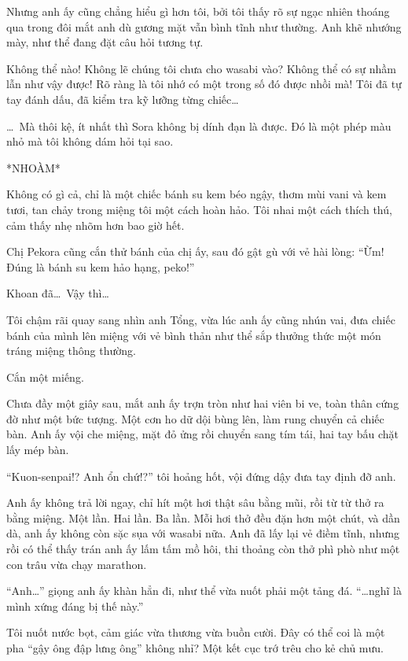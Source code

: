 \documentclass[../main.tex]{subfiles}
\begin{document}
Nhưng anh ấy cũng chẳng hiểu gì hơn tôi, bởi tôi thấy rõ sự ngạc nhiên thoáng qua trong đôi mắt anh dù gương mặt vẫn bình tĩnh như thường. Anh khẽ nhướng mày, như thể đang đặt câu hỏi tương tự.

Không thể nào! Không lẽ chúng tôi chưa cho wasabi vào? Không thể có sự nhầm lẫn như vậy được! Rõ ràng là tôi nhớ có một trong số đó được nhồi mà! Tôi đã tự tay đánh dấu, đã kiểm tra kỹ lưỡng từng chiếc\dots

\dots\ Mà thôi kệ, ít nhất thì Sora không bị dính đạn là được. Đó là một phép màu nhỏ mà tôi không dám hỏi tại sao.

*NHOÀM*

Không có gì cả, chỉ là một chiếc bánh su kem béo ngậy, thơm mùi vani và kem tươi, tan chảy trong miệng tôi một cách hoàn hảo. Tôi nhai một cách thích thú, cảm thấy nhẹ nhõm hơn bao giờ hết.

Chị Pekora cũng cắn thử bánh của chị ấy, sau đó gật gù với vẻ hài lòng: ``Ừm! Đúng là bánh su kem hảo hạng, peko!''

Khoan đã\dots\ Vậy thì\dots

Tôi chậm rãi quay sang nhìn anh Tổng, vừa lúc anh ấy cũng nhún vai, đưa chiếc bánh của mình lên miệng với vẻ bình thản như thể sắp thưởng thức một món tráng miệng thông thường.

Cắn một miếng.

Chưa đầy một giây sau, mắt anh ấy trợn tròn như hai viên bi ve, toàn thân cứng đờ như một bức tượng. Một cơn ho dữ dội bùng lên, làm rung chuyển cả chiếc bàn. Anh ấy vội che miệng, mặt đỏ ửng rồi chuyển sang tím tái, hai tay bấu chặt lấy mép bàn.

``Kuon-senpai!? Anh ổn chứ!?'' tôi hoảng hốt, vội đứng dậy đưa tay định đỡ anh.

Anh ấy không trả lời ngay, chỉ hít một hơi thật sâu bằng mũi, rồi từ từ thở ra bằng miệng. Một lần. Hai lần. Ba lần. Mỗi hơi thở đều đặn hơn một chút, và dần dà, anh ấy không còn sặc sụa với wasabi nữa. Anh đã lấy lại vẻ điềm tĩnh, nhưng rồi có thể thấy trán anh ấy lấm tấm mồ hôi, thi thoảng còn thở phì phò như một con trâu vừa chạy marathon.

``Anh\dots'' giọng anh ấy khàn hẳn đi, như thể vừa nuốt phải một tảng đá. ``\dots nghĩ là mình xứng đáng bị thế này.''

Tôi nuốt nước bọt, cảm giác vừa thương vừa buồn cười. Đây có thể coi là một pha ``gậy ông đập lưng ông'' không nhỉ? Một kết cục trớ trêu cho kẻ chủ mưu.

\ct
\end{document}
